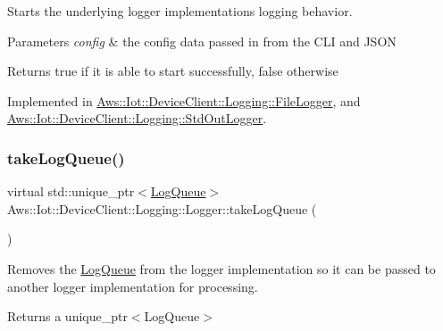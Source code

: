 Starts the underlying logger implementation\textquotesingle{}s logging behavior. 


\begin{DoxyParams}{Parameters}
{\em config} & the config data passed in from the C\+LI and J\+S\+ON \\
\hline
\end{DoxyParams}
\begin{DoxyReturn}{Returns}
true if it is able to start successfully, false otherwise 
\end{DoxyReturn}


Implemented in \hyperlink{class_aws_1_1_iot_1_1_device_client_1_1_logging_1_1_file_logger_ac9373269d6d5c7a5ee1ba896182c97ff}{Aws\+::\+Iot\+::\+Device\+Client\+::\+Logging\+::\+File\+Logger}, and \hyperlink{class_aws_1_1_iot_1_1_device_client_1_1_logging_1_1_std_out_logger_aa27086cd009717d85b957ef1740b14e9}{Aws\+::\+Iot\+::\+Device\+Client\+::\+Logging\+::\+Std\+Out\+Logger}.

\mbox{\label{class_aws_1_1_iot_1_1_device_client_1_1_logging_1_1_logger_a39f3326be17f9ed4b1385f057134774d}} 
\subsubsection{\texorpdfstring{take\+Log\+Queue()}{takeLogQueue()}}
{\footnotesize\ttfamily virtual std\+::unique\+\_\+ptr$<$\hyperlink{class_aws_1_1_iot_1_1_device_client_1_1_logging_1_1_log_queue}{Log\+Queue}$>$ Aws\+::\+Iot\+::\+Device\+Client\+::\+Logging\+::\+Logger\+::take\+Log\+Queue (\begin{DoxyParamCaption}{ }\end{DoxyParamCaption})\hspace{0.3cm}{\ttfamily [pure virtual]}}



Removes the \hyperlink{class_aws_1_1_iot_1_1_device_client_1_1_logging_1_1_log_queue}{Log\+Queue} from the logger implementation so it can be passed to another logger implementation for processing. 

\begin{DoxyReturn}{Returns}
a unique\+\_\+ptr$<$\+Log\+Queue$>$ 
\end{DoxyReturn}


